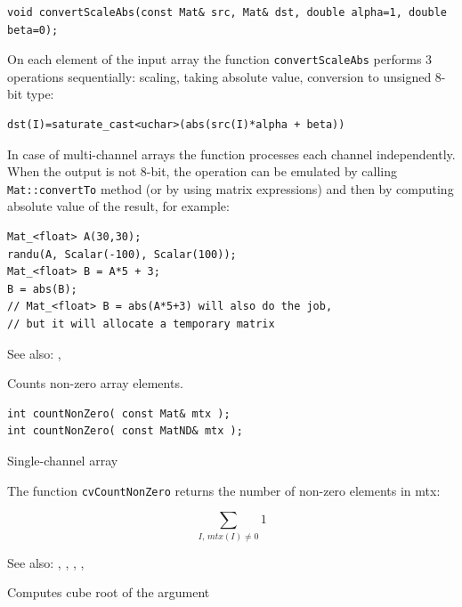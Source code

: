 \begin{lstlisting}
void convertScaleAbs(const Mat& src, Mat& dst, double alpha=1, double beta=0);
\end{lstlisting}
\begin{description}
\end{description}

On each element of the input array the function \texttt{convertScaleAbs} performs 3 operations sequentially: scaling, taking absolute value, conversion to unsigned 8-bit type:

\begin{lstlisting}
dst(I)=saturate_cast<uchar>(abs(src(I)*alpha + beta))
\end{lstlisting}

In case of multi-channel arrays the function processes each channel independently. When the output is not 8-bit, the operation can be emulated by calling \texttt{Mat::convertTo} method (or by using matrix expressions) and then by computing absolute value of the result, for example:

\begin{lstlisting}
Mat_<float> A(30,30);
randu(A, Scalar(-100), Scalar(100));
Mat_<float> B = A*5 + 3;
B = abs(B);
// Mat_<float> B = abs(A*5+3) will also do the job,
// but it will allocate a temporary matrix
\end{lstlisting}

See also: , 

\label{countNonZero}
Counts non-zero array elements.

\begin{lstlisting}
int countNonZero( const Mat& mtx );
int countNonZero( const MatND& mtx );
\end{lstlisting}
\begin{description}
Single-channel array
\end{description}

The function \texttt{cvCountNonZero} returns the number of non-zero elements in mtx:

\[ \sum_{I,\,mtx(I)\ne0} 1 \]

See also: , , , , 

\label{cubeRoot}
Computes cube root of the argument

